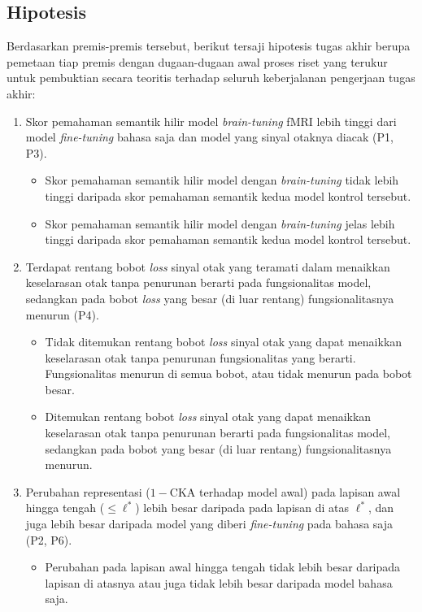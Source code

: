 \subsection*{Hipotesis}
Berdasarkan premis-premis tersebut, berikut tersaji hipotesis tugas akhir berupa pemetaan tiap premis dengan dugaan-dugaan awal proses riset yang terukur untuk pembuktian secara teoritis terhadap seluruh keberjalanan pengerjaan tugas akhir:
\begin{enumerate}[label=H\arabic*.]
    \item Skor pemahaman semantik hilir model \textit{brain-tuning} fMRI lebih tinggi dari model \textit{fine-tuning} bahasa saja dan model yang sinyal otaknya diacak (P1, P3).
    \begin{itemize}
        \item[$H_{0}$:] Skor pemahaman semantik hilir model dengan \textit{brain-tuning} tidak lebih tinggi daripada skor pemahaman semantik kedua model kontrol tersebut.
        \item[$H_{1}$:] Skor pemahaman semantik hilir model dengan \textit{brain-tuning} jelas lebih tinggi daripada skor pemahaman semantik kedua model kontrol tersebut.
    \end{itemize}
    \item Terdapat rentang bobot \textit{loss} sinyal otak yang teramati dalam menaikkan keselarasan otak tanpa penurunan berarti pada fungsionalitas model, sedangkan pada bobot \textit{loss} yang besar (di luar rentang) fungsionalitasnya menurun (P4).
    \begin{itemize}
        \item[$H_{0}$:] Tidak ditemukan rentang bobot \textit{loss} sinyal otak yang dapat menaikkan keselarasan otak tanpa penurunan fungsionalitas yang berarti. Fungsionalitas menurun di semua bobot, atau tidak menurun pada bobot besar.
        \item[$H_{1}$:] Ditemukan rentang bobot \textit{loss} sinyal otak yang dapat menaikkan keselarasan otak tanpa penurunan berarti pada fungsionalitas model, sedangkan pada bobot yang besar (di luar rentang) fungsionalitasnya menurun.
    \end{itemize}
    \item Perubahan representasi ($1-$CKA terhadap model awal) pada lapisan awal hingga tengah ($\le \ell^*$) lebih besar daripada pada lapisan di atas $\ell^*$, dan juga lebih besar daripada model yang diberi \textit{fine-tuning} pada bahasa saja (P2, P6).
    \begin{itemize}
        \item[$H_{0}$:] Perubahan pada lapisan awal hingga tengah tidak lebih besar daripada lapisan di atasnya atau juga tidak lebih besar daripada model bahasa saja.

\end{itemize}
\end{enumerate}
